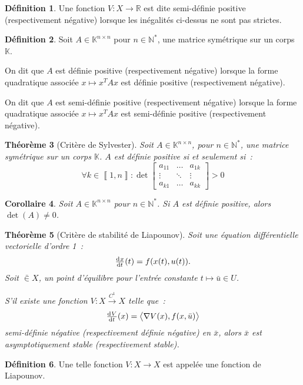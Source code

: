 \documentclass{article}
\newtheorem{thm}{Théorème}[section]
\newtheorem{cor}[thm]{Corollaire}
\theoremstyle{definition}
\newtheorem{déf}[thm]{Définition}
\theoremstyle{remark}
\newcommand{\N}{\mathbb N}
\newcommand{\R}{\mathbb R}
\newcommand{\K}{\mathbb K}
\newcommand{\intint}[2]{{\left\llbracket#1, #2\right\rrbracket}}
\newcommand{\scpr}[2]{{\left\langle#1, #2\right\rangle}}
\begin{document}
	\begin{déf} Une fonction $V : X \to \R$ est dite semi-définie positive (respectivement négative) lorsque les inégalités ci-dessus ne sont pas strictes.
	\end{déf}

	\begin{déf} Soit $A \in \K^{n \times n}$ pour $n \in \N^*$, une matrice symétrique sur un corps $\K$.

	On dit que $A$ est définie positive (respectivement négative) lorsque la forme quadratique associée $x \mapsto x^TAx$ est définie positive
	(respectivement négative).

	On dit que $A$ est semi-définie positive (respectivement négative) lorsque la forme quadratique associée $x \mapsto x^TAx$ est semi-définie positive
	(respectivement négative).
	\end{déf}

	\begin{thm}[Critère de Sylvester] Soit $A \in \K^{n \times n}$, pour $n \in \N^*$, une matrice symétrique sur un corps $\K$. $A$ est définie positive
	si et seulement si~:
	\[\forall k \in \intint 1n : \det
	\begin{bmatrix}
		a_{11} & \ldots & a_{1k} \\
		\vdots & \ddots & \vdots \\
		a_{k1} & \ldots & a_{kk}
	\end{bmatrix} > 0\]
	\end{thm}

	\begin{cor} Soit $A \in \K^{n \times n}$ pour $n \in \N^*$. Si $A$ est définie positive, alors $\det(A) \neq 0$.
	\end{cor}

	\begin{thm}[Critère de stabilité de Liapounov] Soit une équation différentielle vectorielle d'ordre 1~:
	\[\od xt(t) = f(x(t), u(t)).\]
	Soit $\bar \in X$, un point d'équilibre pour l'entrée constante $t \mapsto \bar u \in U$.

	S'il existe une fonction $V : X \xrightarrow{C^1} X$ telle que~:
	\[\od Vt(x) = \scpr {\nabla V(x)}{f(x, \bar u)}\]
	semi-définie négative (respectivement définie négative) en $\bar x$, alors $\bar x$ est asymptotiquement stable (respectivement stable).
	\end{thm}

	\begin{déf} Une telle fonction $V : X \to X$ est appelée une fonction de Liapounov.
	\end{déf}
\end{document}
